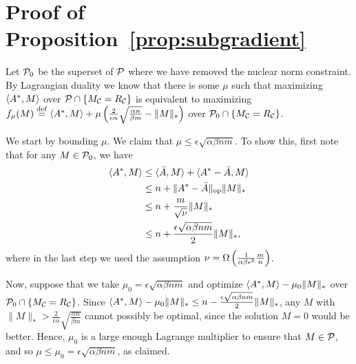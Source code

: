 \section{Proof of Proposition~\ref{prop:subgradient}}
\label{sec:subgradient-proof}
Let $\mathcal{P}_0$ be the superset of $\mathcal{P}$ where we have removed the 
nuclear norm constraint. By Lagrangian duality we 
know that there is some $\mu$ such that maximizing 
$\langle A^*, M \rangle$ over $\mathcal{P} \cap \{M_{\mathcal{C}} = R_{\mathcal{C}}\}$ 
is equivalent to maximizing $f_\mu(M) \stackrel{\rm def}{=} \langle A^*, M \rangle + \mu\left( \frac{2}{\epsilon\alpha}\sqrt{\frac{\alpha n}{\beta m}} - \|M\|_* \right)$ over 
$\mathcal{P}_0 \cap \{M_{\mathcal{C}} = R_{\mathcal{C}}\}$. 

We start by bounding $\mu$. We claim that $\mu \leq \epsilon \sqrt{\alpha\beta nm}$. 
To show this, first note that for any $M \in \mathcal{P}_0$, we have 
\begin{align}
\langle A^*, M \rangle &\leq \langle \bar{A}, M \rangle + \langle A^* - \bar{A}, M \rangle \\
 &\leq n + \|A^* - \bar{A}\|_{\mathrm{op}}\|M\|_* \\
 &\leq n + \frac{m}{\sqrt{\nu}}\|M\|_* \\
 &\leq n + \frac{\epsilon\sqrt{\alpha\beta nm}}{2}\|M\|_*,
\end{align}
where in the last step we used the assumption $\nu = \Omega\left( \frac{1}{\alpha\beta\epsilon^2}\frac{m}{n} \right)$.

Now, suppose that we take $\mu_0 = \epsilon \sqrt{\alpha\beta nm}$ and optimize $\langle A^*, M \rangle - \mu_0\|M\|_*$ over 
$\mathcal{P}_0 \cap \{M_{\mathcal{C}} = R_{\mathcal{C}}\}$. Since $\langle A^*, M \rangle - \mu_0\|M\|_* \leq n - \frac{\epsilon \sqrt{\alpha\beta nm}}{2}\|M\|_*$, 
any $M$ with $\|M\|_* > \frac{2}{\epsilon\alpha}\sqrt{\frac{\alpha n}{\beta m}}$ cannot possibly be optimal, since the solution $M = 0$ would 
be better. Hence, $\mu_0$ is a large enough Lagrange multiplier to ensure that $M \in \mathcal{P}$, and so 
$\mu \leq \mu_0 = \epsilon \sqrt{\alpha\beta nm}$, as claimed.

